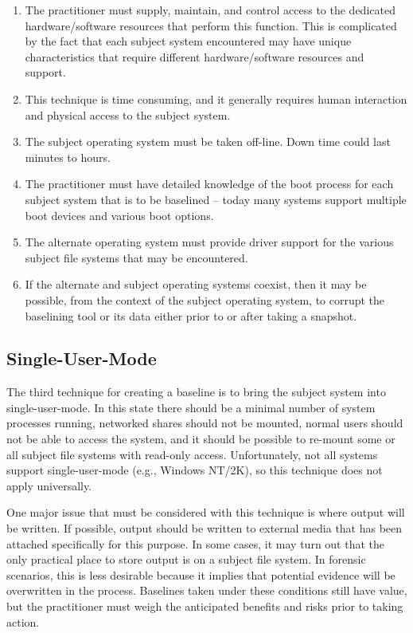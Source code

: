 \documentclass[10pt]{article}
\begin{document}
\begin{enumerate}

  \item
  The practitioner must supply, maintain, and control access to
  the dedicated hardware/software resources that perform this
  function.  This is complicated by the fact that each subject
  system encountered may have unique characteristics that require
  different hardware/software resources and support.

  \item
  This technique is time consuming, and it generally requires human
  interaction and physical access to the subject system.

  \item
  The subject operating system must be taken off-line.  Down time
  could last minutes to hours.

  \item
  The practitioner must have detailed knowledge of the boot process
  for each subject system that is to be baselined -- today many
  systems support multiple boot devices and various boot options.

  \item
  The alternate operating system must provide driver support for
  the various subject file systems that may be encountered.

  \item
  If the alternate and subject operating systems coexist, then it
  may be possible, from the context of the subject operating system,
  to corrupt the baselining tool or its data either prior to or
  after taking a snapshot.

\end{enumerate}

\subsection{Single-User-Mode}

The third technique for creating a baseline is to bring the subject
system into single-user-mode.  In this state there should be a
minimal number of system processes running, networked shares should
not be mounted, normal users should not be able to access the
system, and it should be possible to re-mount some or all subject
file systems with read-only access.  Unfortunately, not all systems
support single-user-mode (e.g., Windows NT/2K), so this technique
does not apply universally.

One major issue that must be considered with this technique is
where output will be written.  If possible, output should be written
to external media that has been attached specifically for this
purpose.  In some cases, it may turn out that the only practical
place to store output is on a subject file system.  In forensic
scenarios, this is less desirable because it implies that potential
evidence will be overwritten in the process.  Baselines taken under
these conditions still have value, but the practitioner must weigh
the anticipated benefits and risks prior to taking action.
\end{document}
